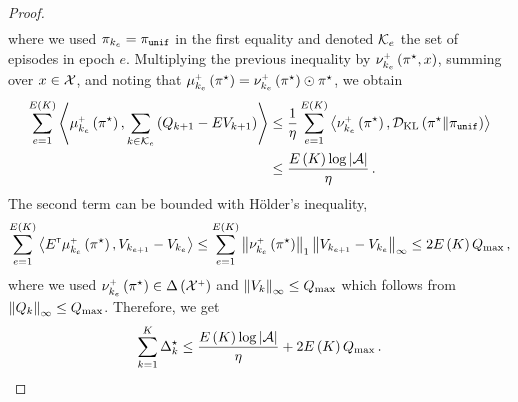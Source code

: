 \begin{proof}
\begin{align*}
    \end{align*}
    where we used $\pi_{k_e} = \pi_{\texttt{unif}}$ in the first equality and denoted $\mathcal{K}_e$ the set of episodes in epoch $e$. Multiplying the previous inequality by $\nu_{k_e}^{\mathsf{\scriptscriptstyle +}} \left( \pi^\star,x \right)$, summing over $x \in \mathcal{X}$, and noting that $\mu_{k_e}^{\mathsf{\scriptscriptstyle +}} \left( \pi^\star \right) = \nu_{k_e}^{\mathsf{\scriptscriptstyle +}} \left( \pi^\star \right) \odot \pi^\star$, we obtain
    \begin{align*}
        \sum_{e=1}^{E \left( K \right)} \left\langle \mu_{k_e}^{\mathsf{\scriptscriptstyle +}} \left( \pi^\star \right), \sum_{k \in \mathcal{K}_e} \left( Q_{k+1} - E V_{k+1} \right) \right\rangle &\leq \frac1\eta \sum_{e=1}^{E \left( K \right)} \left\langle \nu_{k_e}^{\mathsf{\scriptscriptstyle +}} \left( \pi^\star \right), \mathcal{D}_{\text{KL}} \left( \pi^\star \| \pi_{\texttt{unif}} \right) \right\rangle \\
        &\leq \frac{E \left( K \right) \log \left|\mathcal{A}\right|}{\eta}\,.
    \end{align*}
    The second term can be bounded with Hölder's inequality,
    \begin{equation*}
        \sum_{e=1}^{E \left( K \right)} \left\langle E^\mathsf{\scriptscriptstyle T} \mu_{k_e}^{\mathsf{\scriptscriptstyle +}} \left( \pi^\star \right), V_{k_{e+1}} - V_{k_e} \right\rangle \leq \sum_{e=1}^{E \left( K \right)} \left\|\nu_{k_e}^{\mathsf{\scriptscriptstyle +}} \left( \pi^\star \right)\right\|_1 \left\|V_{k_{e+1}} - V_{k_e}\right\|_\infty \leq 2 E \left( K \right) Q_{\max}\,,
    \end{equation*}
    where we used $\nu_{k_e}^{\mathsf{\scriptscriptstyle +}} \left( \pi^\star \right) \in \Delta \left( \mathcal{X}^{\mathsf{\scriptscriptstyle +}} \right)$ and $\left\|V_k\right\|_\infty \leq Q_{\max}$ which follows from $\left\|Q_k\right\|_\infty \leq Q_{\max}$. Therefore, we get
    \begin{equation*}
        \sum_{k=1}^K \Delta_k^\star \leq \frac{E \left( K \right) \log \left|\mathcal{A}\right|}{\eta} + 2 E \left( K \right) Q_{\max}\,.
    \end{equation*}


\end{proof}
